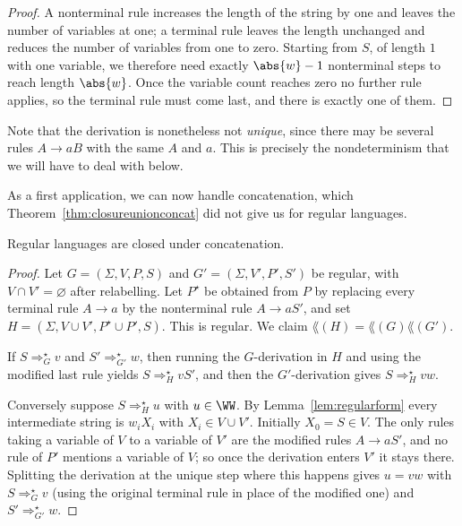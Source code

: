 \begin{proof}
	A nonterminal rule increases the length of the string by one and leaves the number of variables at one; a terminal rule leaves the length unchanged and reduces the number of variables from one to zero. Starting from $S$, of length $1$ with one variable, we therefore need exactly $\abs{w} - 1$ nonterminal steps to reach length $\abs{w}$. Once the variable count reaches zero no further rule applies, so the terminal rule must come last, and there is exactly one of them.
\end{proof}

Note that the derivation is nonetheless not \emph{unique}, since there may be several rules $A \to aB$ with the same $A$ and $a$. This is precisely the nondeterminism that we will have to deal with below.

As a first application, we can now handle concatenation, which Theorem~\ref{thm:closureunionconcat} did not give us for regular languages.

\begin{lemma}\label{lem:regconcat}
	Regular languages are closed under concatenation.
\end{lemma}

\begin{proof}
	Let $G = (\Sigma, V, P, S)$ and $G' = (\Sigma, V', P', S')$ be regular, with $V \cap V' = \varnothing$ after relabelling. Let $P^\star$ be obtained from $P$ by replacing every terminal rule $A \to a$ by the nonterminal rule $A \to aS'$, and set $H = (\Sigma, V \cup V', P^\star \cup P', S)$. This is regular. We claim $\lang(H) = \lang(G)\lang(G')$.

	If $S \Rightarrow_G^\star v$ and $S' \Rightarrow_{G'}^\star w$, then running the $G$-derivation in $H$ and using the modified last rule yields $S \Rightarrow_H^\star vS'$, and then the $G'$-derivation gives $S \Rightarrow_H^\star vw$.

	Conversely suppose $S \Rightarrow_H^\star u$ with $u \in \WW$. By Lemma~\ref{lem:regularform} every intermediate string is $w_iX_i$ with $X_i \in V \cup V'$. Initially $X_0 = S \in V$. The only rules taking a variable of $V$ to a variable of $V'$ are the modified rules $A \to aS'$, and no rule of $P'$ mentions a variable of $V$; so once the derivation enters $V'$ it stays there. Splitting the derivation at the unique step where this happens gives $u = vw$ with $S \Rightarrow_G^\star v$ (using the original terminal rule in place of the modified one) and $S' \Rightarrow_{G'}^\star w$.
\end{proof}

